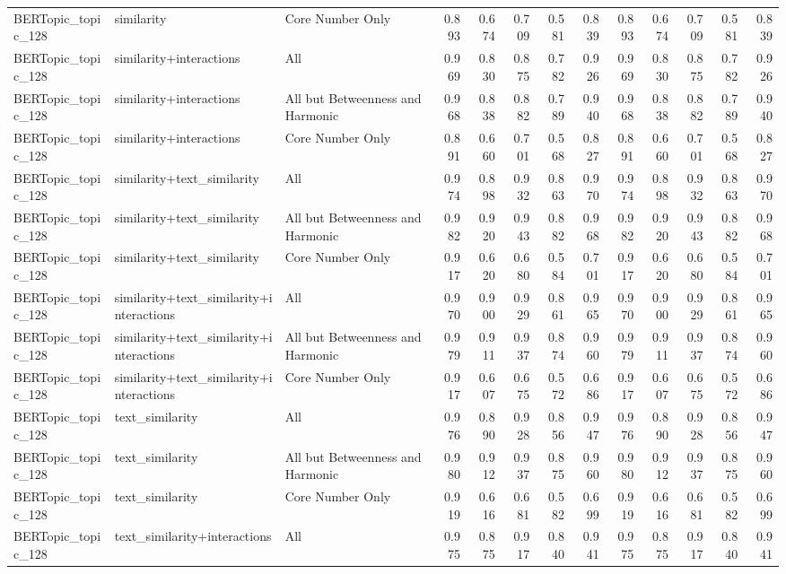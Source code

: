 \begin{tabular}{lllrrrrrrrrrr}
BERTopic\_topic\_128 & similarity & Core Number Only & 0.893 & 0.674 & 0.709 & 0.581 & 0.839 & 0.893 & 0.674 & 0.709 & 0.581 & 0.839 \\
BERTopic\_topic\_128 & similarity+interactions & All & 0.969 & 0.830 & 0.875 & 0.782 & 0.926 & 0.969 & 0.830 & 0.875 & 0.782 & 0.926 \\
BERTopic\_topic\_128 & similarity+interactions & All but Betweenness and Harmonic & 0.968 & 0.838 & 0.882 & 0.789 & 0.940 & 0.968 & 0.838 & 0.882 & 0.789 & 0.940 \\
BERTopic\_topic\_128 & similarity+interactions & Core Number Only & 0.891 & 0.660 & 0.701 & 0.568 & 0.827 & 0.891 & 0.660 & 0.701 & 0.568 & 0.827 \\
BERTopic\_topic\_128 & similarity+text\_similarity & All & 0.974 & 0.898 & 0.932 & 0.863 & 0.970 & 0.974 & 0.898 & 0.932 & 0.863 & 0.970 \\
BERTopic\_topic\_128 & similarity+text\_similarity & All but Betweenness and Harmonic & 0.982 & 0.920 & 0.943 & 0.882 & 0.968 & 0.982 & 0.920 & 0.943 & 0.882 & 0.968 \\
BERTopic\_topic\_128 & similarity+text\_similarity & Core Number Only & 0.917 & 0.620 & 0.680 & 0.584 & 0.701 & 0.917 & 0.620 & 0.680 & 0.584 & 0.701 \\
BERTopic\_topic\_128 & similarity+text\_similarity+interactions & All & 0.970 & 0.900 & 0.929 & 0.861 & 0.965 & 0.970 & 0.900 & 0.929 & 0.861 & 0.965 \\
BERTopic\_topic\_128 & similarity+text\_similarity+interactions & All but Betweenness and Harmonic & 0.979 & 0.911 & 0.937 & 0.874 & 0.960 & 0.979 & 0.911 & 0.937 & 0.874 & 0.960 \\
BERTopic\_topic\_128 & similarity+text\_similarity+interactions & Core Number Only & 0.917 & 0.607 & 0.675 & 0.572 & 0.686 & 0.917 & 0.607 & 0.675 & 0.572 & 0.686 \\
BERTopic\_topic\_128 & text\_similarity & All & 0.976 & 0.890 & 0.928 & 0.856 & 0.947 & 0.976 & 0.890 & 0.928 & 0.856 & 0.947 \\
BERTopic\_topic\_128 & text\_similarity & All but Betweenness and Harmonic & 0.980 & 0.912 & 0.937 & 0.875 & 0.960 & 0.980 & 0.912 & 0.937 & 0.875 & 0.960 \\
BERTopic\_topic\_128 & text\_similarity & Core Number Only & 0.919 & 0.616 & 0.681 & 0.582 & 0.699 & 0.919 & 0.616 & 0.681 & 0.582 & 0.699 \\
BERTopic\_topic\_128 & text\_similarity+interactions & All & 0.975 & 0.875 & 0.917 & 0.840 & 0.941 & 0.975 & 0.875 & 0.917 & 0.840 & 0.941 \\

\end{tabular}
